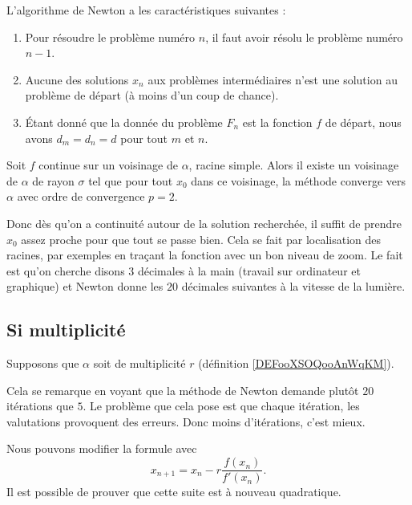 L'algorithme de Newton a les caractéristiques suivantes :
\begin{enumerate}

	\item
		Pour résoudre le problème numéro $n$, il faut avoir résolu le problème numéro $n-1$.
	\item
		Aucune des solutions $x_n$ aux problèmes intermédiaires n'est une solution au problème de départ (à moins d'un coup de chance).
	\item
		Étant donné que la donnée du problème $F_n$ est la fonction $f$ de départ, nous avons $d_m=d_n=d$ pour tout $m$ et $n$.
\end{enumerate}

\begin{theorem}     \label{THOooMACHooLofCVu}
    Soit \( f\) continue sur un voisinage de \( \alpha\), racine simple. Alors il existe un voisinage de \( \alpha\) de rayon \( \sigma\) tel que pour tout \( x_0\) dans ce voisinage, la méthode converge vers \( \alpha\) avec ordre de convergence \( p=2\).
\end{theorem}

Donc dès qu'on a continuité autour de la solution recherchée, il suffit de prendre \( x_0\) assez proche pour que tout se passe bien. Cela se fait par localisation des racines, par exemples en traçant la fonction avec un bon niveau de zoom. Le fait est qu'on cherche disons \( 3\) décimales à la main (travail sur ordinateur et graphique) et Newton donne les \( 20\) décimales suivantes à la vitesse de la lumière.

\subsection{Si multiplicité}

Supposons que \( \alpha\) soit de multiplicité \( r\) (définition \ref{DEFooXSOQooAnWqKM}).

Cela se remarque en voyant que la méthode de Newton demande plutôt \( 20\) itérations que \( 5\). Le problème que cela pose est que chaque itération, les valutations provoquent des erreurs. Donc moins d'itérations, c'est mieux.

Nous pouvons modifier la formule avec
\begin{equation}
    x_{n+1}=x_n-r\frac{ f(x_n) }{ f'(x_n) }.
\end{equation}
Il est possible de prouver que cette suite est à nouveau quadratique.


